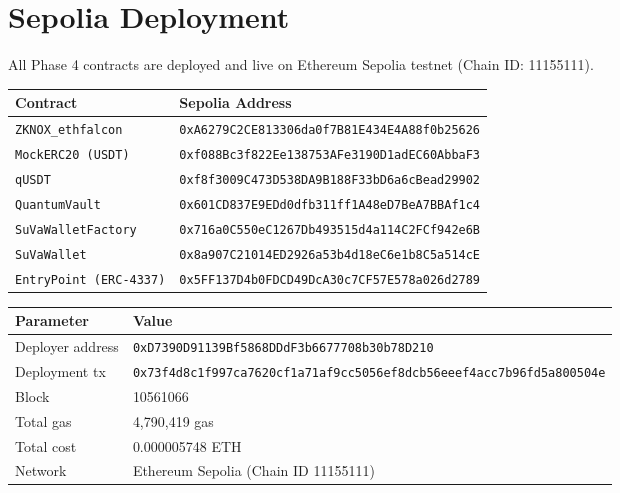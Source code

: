 \documentclass[11pt,a4paper]{article}
\begin{document}
\section{Sepolia Deployment}

All Phase 4 contracts are deployed and live on Ethereum Sepolia testnet (Chain ID: 11155111).

\begin{center}
\begin{tabular}{ll}
\toprule
\textbf{Contract} & \textbf{Sepolia Address} \\
\midrule
\texttt{ZKNOX\_ethfalcon}    & \texttt{0xA6279C2CE813306da0f7B81E434E4A88f0b25626} \\
\texttt{MockERC20 (USDT)}   & \texttt{0xf088Bc3f822Ee138753AFe3190D1adEC60AbbaF3} \\
\texttt{qUSDT}               & \texttt{0xf8f3009C473D538DA9B188F33bD6a6cBead29902} \\
\texttt{QuantumVault}        & \texttt{0x601CD837E9EDd0dfb311ff1A48eD7BeA7BBAf1c4} \\
\texttt{SuVaWalletFactory}   & \texttt{0x716a0C550eC1267Db493515d4a114C2FCf942e6B} \\
\texttt{SuVaWallet}          & \texttt{0x8a907C21014ED2926a53b4d18eC6e1b8C5a514cE} \\
\texttt{EntryPoint (ERC-4337)} & \texttt{0x5FF137D4b0FDCD49DcA30c7CF57E578a026d2789} \\
\bottomrule
\end{tabular}
\end{center}

\begin{center}
\begin{tabular}{ll}
\toprule
\textbf{Parameter} & \textbf{Value} \\
\midrule
Deployer address  & \texttt{0xD7390D91139Bf5868DDdF3b6677708b30b78D210} \\
Deployment tx     & \texttt{0x73f4d8c1f997ca7620cf1a71af9cc5056ef8dcb56eeef4acc7b96fd5a800504e} \\
Block             & 10561066 \\
Total gas         & 4,790,419 gas \\
Total cost        & 0.000005748 ETH \\
Network           & Ethereum Sepolia (Chain ID 11155111) \\
\bottomrule
\end{tabular}
\end{center}
\end{document}
